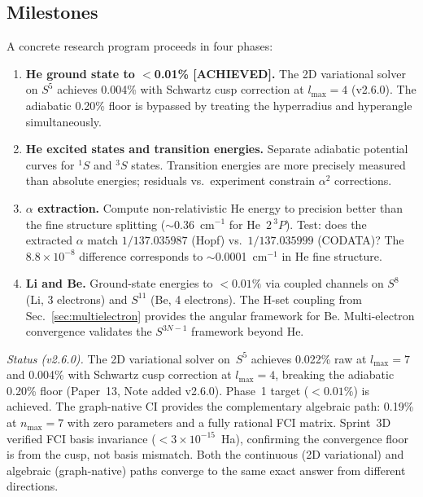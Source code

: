 \documentclass[aps,pra,twocolumn,superscriptaddress,longbibliography]{revtex4-2}
\begin{document}
\subsection{Milestones}

A concrete research program proceeds in four phases:
\begin{enumerate}
\item \textbf{He ground state to $<$0.01\% [ACHIEVED].}  The 2D
  variational solver on $S^5$ achieves 0.004\% with Schwartz cusp
  correction at $l_{\max} = 4$ (v2.6.0).  The adiabatic 0.20\% floor
  is bypassed by treating the hyperradius and hyperangle simultaneously.

\item \textbf{He excited states and transition energies.}  Separate
  adiabatic potential curves for ${}^1S$ and ${}^3S$ states.  Transition
  energies are more precisely measured than absolute energies; residuals
  vs.\ experiment constrain $\alpha^2$ corrections.

\item \textbf{$\alpha$ extraction.}  Compute non-relativistic He energy
  to precision better than the fine structure splitting
  ($\sim$0.36~cm$^{-1}$ for He~$2\,{}^3P$).  Test: does the extracted
  $\alpha$ match $1/137.035987$ (Hopf) vs.\ $1/137.035999$ (CODATA)?
  The $8.8 \times 10^{-8}$ difference corresponds to $\sim$0.0001~cm$^{-1}$
  in He fine structure.

\item \textbf{Li and Be.}  Ground-state energies to $< 0.01\%$ via
  coupled channels on $S^8$ (Li, 3 electrons) and $S^{11}$ (Be, 4
  electrons).  The H-set coupling from Sec.~\ref{sec:multielectron}
  provides the angular framework for Be.  Multi-electron convergence
  validates the $S^{3N-1}$ framework beyond He.
\end{enumerate}

\noindent
\textit{Status (v2.6.0).}  The 2D variational solver on~$S^5$
achieves 0.022\% raw at $l_{\max} = 7$ and 0.004\% with Schwartz
cusp correction at $l_{\max} = 4$, breaking the adiabatic 0.20\%
floor (Paper~13, Note added v2.6.0).  Phase~1 target ($< 0.01\%$)
is achieved.  The graph-native CI provides the complementary
algebraic path: 0.19\% at $n_{\max} = 7$ with zero parameters and
a fully rational FCI matrix.  Sprint~3D verified FCI basis invariance
($< 3 \times 10^{-15}$~Ha), confirming the convergence floor is
from the cusp, not basis mismatch.  Both the continuous (2D
variational) and algebraic (graph-native) paths converge to the
same exact answer from different directions.
\end{document}

